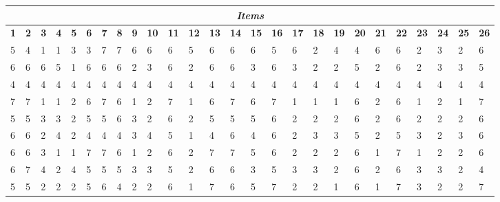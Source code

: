 \begin{landscape}
    \centering
    \begin{table}
        \centering
        \begin{tabular}{|p{0.5cm}|p{0.5cm}|p{0.5cm}|p{0.5cm}|p{0.5cm}|p{0.5cm}|p{0.5cm}|p{0.5cm}|p{0.5cm}|p{0.5cm}|p{0.5cm}|p{0.5cm}|p{0.5cm}|p{0.5cm}|p{0.5cm}|p{0.5cm}|p{0.5cm}|p{0.5cm}|p{0.5cm}|p{0.5cm}|p{0.5cm}|p{0.5cm}|p{0.5cm}|p{0.5cm}|p{0.5cm}|p{0.5cm}|}
        \hline
        \multicolumn{26}{|c|}{\centering \textit{Items}} \\
        \hline
        \textbf{1}&\textbf{2}&\textbf{3}&\textbf{4}&\textbf{5}&\textbf{6}&\textbf{7}&\textbf{8}&\textbf{9}&\textbf{10}&\textbf{11}&\textbf{12}&\textbf{13}&\textbf{14}&\textbf{15}&\textbf{16}&\textbf{17}&\textbf{18}&\textbf{19}&\textbf{20}&\textbf{21}&\textbf{22}&\textbf{23}&\textbf{24}&\textbf{25}&\textbf{26} \\
        \hline
        5 & 4 & 1 & 1 & 3 & 3 & 7 & 7 & 6 & 6  & 6  & 5  & 6  & 6  & 6  & 5  & 6  & 2  & 4  & 4  & 6  & 6  & 2  & 3  & 2  & 6  \\
        \hline
        6 & 6 & 6 & 5 & 1 & 6 & 6 & 6 & 2 & 3  & 6  & 2  & 6  & 6  & 3  & 6  & 3  & 2  & 2  & 5  & 2  & 6  & 2  & 3  & 3  & 5  \\
        \hline
        4 & 4 & 4 & 4 & 4 & 4 & 4 & 4 & 4 & 4  & 4  & 4  & 4  & 4  & 4  & 4  & 4  & 4  & 4  & 4  & 4  & 4  & 4  & 4  & 4  & 4  \\
        \hline
        7 & 7 & 1 & 1 & 2 & 6 & 7 & 6 & 1 & 2  & 7  & 1  & 6  & 7  & 6  & 7  & 1  & 1  & 1  & 6  & 2  & 6  & 1  & 2  & 1  & 7  \\
        \hline
        5 & 5 & 3 & 3 & 2 & 5 & 5 & 6 & 3 & 2  & 6  & 2  & 5  & 5  & 5  & 6  & 2  & 2  & 2  & 6  & 2  & 6  & 2  & 2  & 2  & 6  \\
        \hline
        6 & 6 & 2 & 4 & 2 & 4 & 4 & 4 & 3 & 4  & 5  & 1  & 4  & 6  & 4  & 6  & 2  & 3  & 3  & 5  & 2  & 5  & 3  & 2  & 3  & 6  \\
        \hline
        6 & 6 & 3 & 1 & 1 & 7 & 7 & 6 & 1 & 2  & 6  & 2  & 7  & 7  & 5  & 6  & 2  & 2  & 2  & 6  & 1  & 7  & 1  & 2  & 2  & 6  \\
        \hline
        6 & 7 & 4 & 2 & 4 & 5 & 5 & 5 & 3 & 3  & 5  & 2  & 6  & 6  & 3  & 5  & 3  & 3  & 2  & 6  & 2  & 6  & 3  & 3  & 2  & 4  \\
        \hline
        5 & 5 & 2 & 2 & 2 & 5 & 6 & 4 & 2 & 2  & 6  & 1  & 7  & 6  & 5  & 7  & 2  & 2  & 1  & 6  & 1  & 7  & 3  & 2  & 2  & 7  \\

\end{tabular}
\end{table}
\end{landscape}
